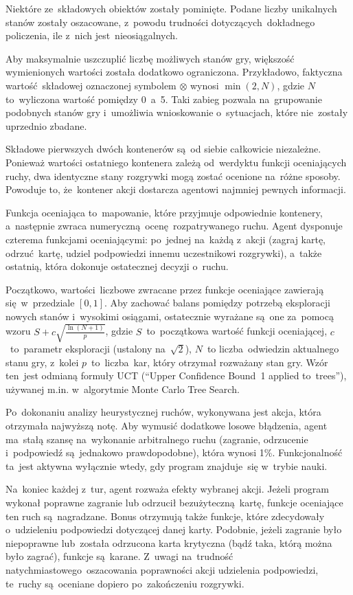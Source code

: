 \documentclass[declaration,shortabstract,inz]{iithesis}
\begin{document}
Niektóre ze~składowych obiektów zostały pominięte. Podane liczby unikalnych stanów zostały oszacowane, z~powodu trudności dotyczących dokładnego policzenia, ile z~nich jest~nieosiągalnych.

Aby maksymalnie uszczuplić liczbę możliwych stanów gry, większość wymienionych wartości została dodatkowo ograniczona. Przykładowo, faktyczna wartość składowej oznaczonej symbolem $\otimes$ wynosi $\min{(2, N)}$, gdzie $N$ to~wyliczona wartość pomiędzy 0~a~5. Taki zabieg pozwala na~grupowanie podobnych stanów gry i~umożliwia wnioskowanie o~sytuacjach, które nie~zostały uprzednio zbadane.

Składowe pierwszych dwóch kontenerów są~od siebie całkowicie niezależne. Ponieważ wartości ostatniego kontenera zależą od~werdyktu funkcji oceniających ruchy, dwa identyczne stany rozgrywki mogą zostać ocenione na~różne sposoby. Powoduje to, że~kontener akcji dostarcza agentowi najmniej pewnych informacji.

Funkcja oceniająca to~mapowanie, które przyjmuje odpowiednie kontenery, a~następnie zwraca numeryczną ocenę rozpatrywanego ruchu. Agent dysponuje czterema funkcjami oceniającymi: po~jednej na~każdą z~akcji (zagraj kartę, odrzuć kartę, udziel podpowiedzi innemu uczestnikowi rozgrywki), a~także ostatnią, która dokonuje ostatecznej decyzji o~ruchu.

Początkowo, wartości liczbowe zwracane przez funkcje oceniające zawierają się w~przedziale $[0,1]$. Aby zachować balans pomiędzy potrzebą eksploracji nowych stanów i~wysokimi osiągami, ostatecznie wyrażane są~one za~pomocą wzoru ${S+c\sqrt{\frac{\ln (N+1)}{p}}}$, gdzie $S$~to~początkowa wartość funkcji oceniającej, $c$~to~parametr eksploracji (ustalony na~$\sqrt{2}$), $N$~to liczba odwiedzin aktualnego stanu gry, z~kolei $p$~to~liczba kar, który otrzymał rozważany stan gry. Wzór ten~jest odmianą formuły UCT (``Upper Confidence Bound~1 applied to~trees''), używanej m.in. w~algorytmie Monte Carlo Tree Search\cite{UCT}.

Po~dokonaniu analizy heurystycznej ruchów, wykonywana jest akcja, która otrzymała najwyższą notę. Aby wymusić dodatkowe losowe błądzenia, agent ma~stałą szansę na~wykonanie arbitralnego ruchu (zagranie, odrzucenie i~podpowiedź są~jednakowo prawdopodobne), która wynosi 1\%. Funkcjonalność ta~jest aktywna wyłącznie wtedy, gdy program znajduje~się w~trybie nauki.

Na~koniec każdej z~tur, agent rozważa efekty wybranej akcji. Jeżeli program wykonał poprawne zagranie lub odrzucił bezużyteczną kartę, funkcje oceniające ten ruch są~nagradzane. Bonus otrzymują także funkcje, które zdecydowały o~udzieleniu podpowiedzi dotyczącej danej karty. Podobnie, jeżeli zagranie było niepoprawne lub~została odrzucona karta krytyczna (bądź taka, którą można było zagrać), funkcje są~karane. Z~uwagi na~trudność natychmiastowego oszacowania poprawności akcji udzielenia podpowiedzi, te~ruchy są~oceniane dopiero po~zakończeniu rozgrywki.
\end{document}

